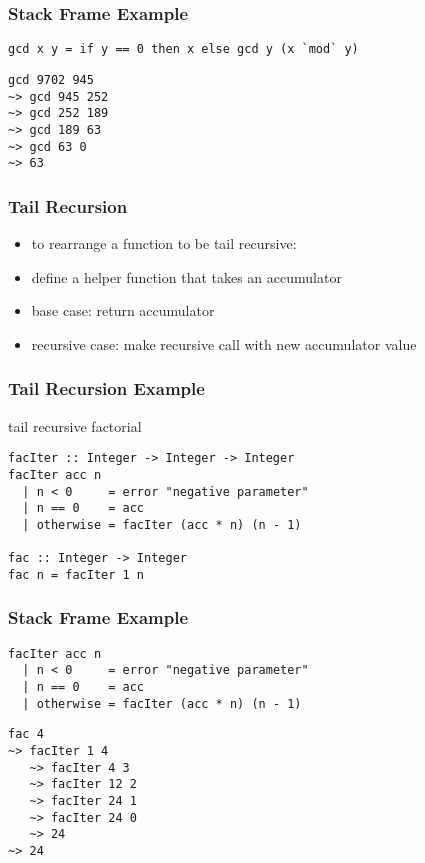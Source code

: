 \documentclass[dvipsnames]{beamer}
\theoremstyle{plain}
\begin{document}
\begin{frame}[fragile]
  \frametitle{Stack Frame Example}

  \begin{exampleblock}{}
    \begin{lstlisting}
gcd x y = if y == 0 then x else gcd y (x `mod` y)
    \end{lstlisting}

    \begin{lstlisting}[frame=single]
gcd 9702 945
~> gcd 945 252
~> gcd 252 189
~> gcd 189 63
~> gcd 63 0
~> 63
    \end{lstlisting}
  \end{exampleblock}
\end{frame}

\begin{frame}
  \frametitle{Tail Recursion}

  \begin{itemize}
    \item to rearrange a function to be tail recursive:

    \medskip
    \item define a helper function that takes an accumulator
    \item base case: return accumulator
    \item recursive case: make recursive call with new accumulator value
  \end{itemize}
\end{frame}

\begin{frame}[fragile]
  \frametitle{Tail Recursion Example}

  \begin{exampleblock}{tail recursive factorial}
    \begin{lstlisting}
facIter :: Integer -> Integer -> Integer
facIter acc n
  | n < 0     = error "negative parameter"
  | n == 0    = acc
  | otherwise = facIter (acc * n) (n - 1)

fac :: Integer -> Integer
fac n = facIter 1 n
    \end{lstlisting}
  \end{exampleblock}
\end{frame}

\begin{frame}[fragile]
  \frametitle{Stack Frame Example}

  \begin{exampleblock}{}
  \begin{lstlisting}
facIter acc n
  | n < 0     = error "negative parameter"
  | n == 0    = acc
  | otherwise = facIter (acc * n) (n - 1)
  \end{lstlisting}

    \begin{lstlisting}[frame=single]
fac 4
~> facIter 1 4
   ~> facIter 4 3
   ~> facIter 12 2
   ~> facIter 24 1
   ~> facIter 24 0
   ~> 24
~> 24
    \end{lstlisting}
  \end{exampleblock}
\end{frame}
\end{document}
